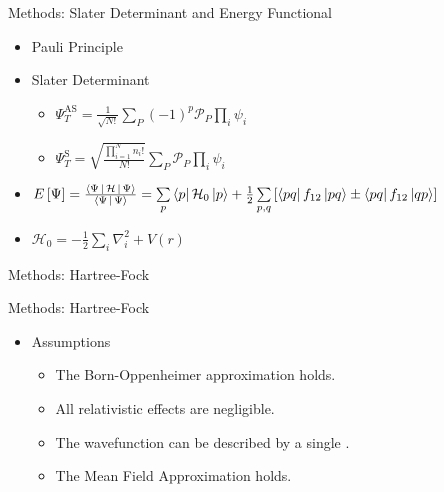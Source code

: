 \documentclass[10pt, t, xcolor=dvipsnames]{beamer}
\begin{document}
{{\begin{frame}[fragile]{Methods: Slater Determinant and Energy Functional}
    \begin{itemize}
        \item Pauli Principle
        \item Slater Determinant
            \begin{itemize}
                \item $\Psi^{\text{AS}}_T =
                    \frac{1}{\sqrt{N!}}\sum\limits_{P}(-1)^p\mathcal{P}_P\prod\limits_i\psi_i$
                \item $\Psi^{\text{S}}_T =
                    \sqrt{\frac{\prod\limits^N_{i=1}n_i!}{N!}}\sum\limits_{P}\mathcal{P}_P\prod\limits_i\psi_i$
            \end{itemize}
        \item $E\left[\Psi\right] =
            \frac{\Braket{\Psi|\mathcal{H}|\Psi}}{\Braket{\Psi|\Psi}} =
            \sum\limits_p\bra{p}\mathcal{H}_0\ket{p} +
            \frac{1}{2}\sum\limits_{p,q}\left[\bra{pq}f_{12}\ket{pq} \pm
            \bra{pq}f_{12}\ket{qp}\right]$
        \item $\mathcal{H}_0 = -\frac{1}{2}\sum\limits_i\nabla^2_i + V(r)$
    \end{itemize}
\end{frame}

\begin{frame}[fragile]{Methods: Hartree-Fock}
\end{frame}

\begin{frame}[fragile]{Methods: Hartree-Fock}
    \begin{itemize}
        \item Assumptions
        \begin{itemize}
            \item The Born-Oppenheimer approximation holds. 
            \item All relativistic effects are negligible.
            \item The wavefunction can be described by a single .
            \item The Mean Field Approximation holds.
        \end{itemize}
    \end{itemize}
\end{frame}

}}
\end{document}
